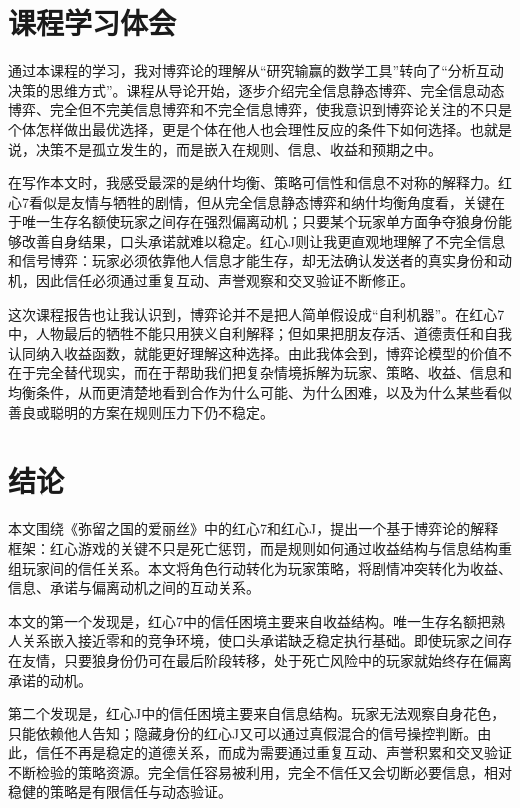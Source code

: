 \documentclass{article}
\begin{document}
\section{课程学习体会}

通过本课程的学习，我对博弈论的理解从“研究输赢的数学工具”转向了“分析互动决策的思维方式”。课程从导论开始，逐步介绍完全信息静态博弈、完全信息动态博弈、完全但不完美信息博弈和不完全信息博弈，使我意识到博弈论关注的不只是个体怎样做出最优选择，更是个体在他人也会理性反应的条件下如何选择。也就是说，决策不是孤立发生的，而是嵌入在规则、信息、收益和预期之中。

在写作本文时，我感受最深的是纳什均衡、策略可信性和信息不对称的解释力。红心7看似是友情与牺牲的剧情，但从完全信息静态博弈和纳什均衡角度看，关键在于唯一生存名额使玩家之间存在强烈偏离动机；只要某个玩家单方面争夺狼身份能够改善自身结果，口头承诺就难以稳定。红心J则让我更直观地理解了不完全信息和信号博弈：玩家必须依靠他人信息才能生存，却无法确认发送者的真实身份和动机，因此信任必须通过重复互动、声誉观察和交叉验证不断修正。

这次课程报告也让我认识到，博弈论并不是把人简单假设成“自利机器”。在红心7中，人物最后的牺牲不能只用狭义自利解释；但如果把朋友存活、道德责任和自我认同纳入收益函数，就能更好理解这种选择。由此我体会到，博弈论模型的价值不在于完全替代现实，而在于帮助我们把复杂情境拆解为玩家、策略、收益、信息和均衡条件，从而更清楚地看到合作为什么可能、为什么困难，以及为什么某些看似善良或聪明的方案在规则压力下仍不稳定。

\section{结论}

本文围绕《弥留之国的爱丽丝》中的红心7和红心J，提出一个基于博弈论的解释框架：红心游戏的关键不只是死亡惩罚，而是规则如何通过收益结构与信息结构重组玩家间的信任关系。本文将角色行动转化为玩家策略，将剧情冲突转化为收益、信息、承诺与偏离动机之间的互动关系。

本文的第一个发现是，红心7中的信任困境主要来自收益结构。唯一生存名额把熟人关系嵌入接近零和的竞争环境，使口头承诺缺乏稳定执行基础。即使玩家之间存在友情，只要狼身份仍可在最后阶段转移，处于死亡风险中的玩家就始终存在偏离承诺的动机。

第二个发现是，红心J中的信任困境主要来自信息结构。玩家无法观察自身花色，只能依赖他人告知；隐藏身份的红心J又可以通过真假混合的信号操控判断。由此，信任不再是稳定的道德关系，而成为需要通过重复互动、声誉积累和交叉验证不断检验的策略资源。完全信任容易被利用，完全不信任又会切断必要信息，相对稳健的策略是有限信任与动态验证。
\end{document}
